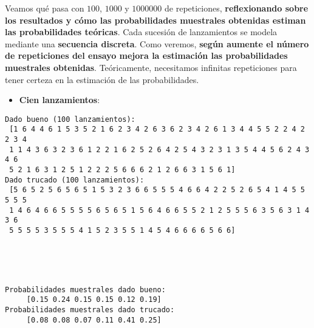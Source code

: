 \documentclass[11pt]{article}
\providecommand{\tightlist}{%
      \setlength{\itemsep}{0pt}\setlength{\parskip}{0pt}}
\begin{document}
    Veamos qué pasa con \(100\), \(1000\) y \(1000000\) de repeticiones,
\textbf{reflexionando sobre los resultados y cómo las probabilidades
muestrales obtenidas estiman las probabilidades teóricas}. Cada sucesión
de lanzamientos se modela mediante una \textbf{secuencia discreta}. Como
veremos, \textbf{según aumente el número de repeticiones del ensayo
mejora la estimación las probabilidades muestrales obtenidas}.
Teóricamente, necesitamos infinitas repeticiones para tener certeza en
la estimación de las probabilidades.

\begin{itemize}
\tightlist
\item
  \textbf{Cien lanzamientos}:
\end{itemize}

    \begin{Verbatim}[commandchars=\\\{\}]
Dado bueno (100 lanzamientos):
 [1 6 4 4 6 1 5 3 5 2 1 6 2 3 4 2 6 3 6 2 3 4 2 6 1 3 4 4 5 5 2 2 4 2 2 3 4
 1 1 4 3 6 3 2 3 6 1 2 2 1 6 2 5 2 6 4 2 5 4 3 2 3 1 3 5 4 4 5 6 2 4 3 4 6
 5 2 1 6 3 1 2 5 1 2 2 2 5 6 6 6 2 1 2 6 6 3 1 5 6 1]
Dado trucado (100 lanzamientos):
 [5 6 5 2 5 6 5 6 5 1 5 3 2 3 6 6 5 5 5 4 6 6 4 2 2 5 2 6 5 4 1 4 5 5 5 5 5
 1 4 6 4 6 6 5 5 5 5 6 5 6 5 1 5 6 4 6 6 5 5 2 1 2 5 5 5 6 3 5 6 3 1 4 3 6
 5 5 5 5 3 5 5 5 4 1 5 2 3 5 5 1 4 5 4 6 6 6 6 5 6 6]

    \end{Verbatim}

    \begin{center}
    \end{center}
    { \hspace*{\fill} \\}
    
    \begin{center}
    \end{center}
    { \hspace*{\fill} \\}
    
    \begin{Verbatim}[commandchars=\\\{\}]
Probabilidades muestrales dado bueno: 
	 [0.15 0.24 0.15 0.15 0.12 0.19]
Probabilidades muestrales dado trucado:
	 [0.08 0.08 0.07 0.11 0.41 0.25]

    \end{Verbatim}
\end{document}
